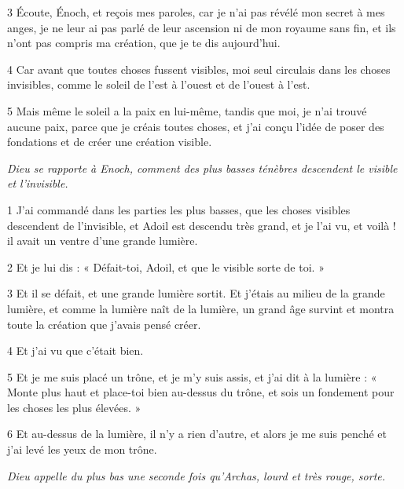 \par 3 Écoute, Énoch, et reçois mes paroles, car je n'ai pas révélé mon secret à mes anges, je ne leur ai pas parlé de leur ascension ni de mon royaume sans fin, et ils n'ont pas compris ma création, que je te dis aujourd'hui.

\par 4 Car avant que toutes choses fussent visibles, moi seul circulais dans les choses invisibles, comme le soleil de l'est à l'ouest et de l'ouest à l'est.

\par 5 Mais même le soleil a la paix en lui-même, tandis que moi, je n'ai trouvé aucune paix, parce que je créais toutes choses, et j'ai conçu l'idée de poser des fondations et de créer une création visible.


\par \textit{Dieu se rapporte à Enoch, comment des plus basses ténèbres descendent le visible et l'invisible.}

\par 1 J'ai commandé dans les parties les plus basses, que les choses visibles descendent de l'invisible, et Adoil est descendu très grand, et je l'ai vu, et voilà ! il avait un ventre d'une grande lumière.

\par 2 Et je lui dis : « Défait-toi, Adoil, et que le visible sorte de toi. »

\par 3 Et il se défait, et une grande lumière sortit. Et j'étais au milieu de la grande lumière, et comme la lumière naît de la lumière, un grand âge survint et montra toute la création que j'avais pensé créer.

\par 4 Et j'ai vu que c'était bien.

\par 5 Et je me suis placé un trône, et je m'y suis assis, et j'ai dit à la lumière : « Monte plus haut et place-toi bien au-dessus du trône, et sois un fondement pour les choses les plus élevées. »

\par 6 Et au-dessus de la lumière, il n'y a rien d'autre, et alors je me suis penché et j'ai levé les yeux de mon trône.


\par \textit{Dieu appelle du plus bas une seconde fois qu'Archas, lourd et très rouge, sorte.}

